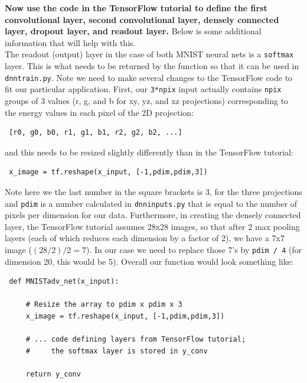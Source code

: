 \documentclass[10pt]{article}
\begin{document}
\noindent \textbf{Now use the code in the TensorFlow tutorial to define the first convolutional layer, second convolutional layer, densely connected layer, dropout layer, and readout layer.}  Below is some additional information that will help with this.\\

\noindent The readout 
(output) layer in the case of both MNIST neural nets is a \verb|softmax| layer.  This is what needs to be returned by the function so that it can be used in \verb|dnntrain.py|.  Note we need to
make several changes to the TensorFlow code to fit our particular application.  First, our \verb|3*npix| input actually contains \verb|npix| groups of 3 values (r, g, and b for xy, yz, and xz projections) corresponding 
to the energy values in each pixel of the 2D projection:

\begin{verbatim}
 [r0, g0, b0, r1, g1, b1, r2, g2, b2, ...]
\end{verbatim}

\noindent and this needs to be resized slightly differently than in the TensorFlow tutorial:

\begin{verbatim}
 x_image = tf.reshape(x_input, [-1,pdim,pdim,3])
\end{verbatim}

\noindent Note here we the last number in the square brackets is 3, for the three projections and \verb|pdim| is a number calculated in \verb|dnninputs.py| that is equal to the number of
pixels per dimension for our data.  Furthermore, in creating the densely connected layer, the TensorFlow tutorial assumes 
28x28 images, so that after 2 max pooling layers (each of which reduces each dimension
by a factor of 2), we have a 7x7 image ($(28 / 2) / 2 = 7$).  In our case we need to replace those 7's by \verb|pdim / 4| (for dimension 20, this would be 5).  Overall our function would
look something like:
\newpage
\begin{verbatim}
 def MNISTadv_net(x_input):

     # Resize the array to pdim x pdim x 3
     x_image = tf.reshape(x_input, [-1,pdim,pdim,3])
     
     # ... code defining layers from TensorFlow tutorial; 
     #     the softmax layer is stored in y_conv
     
     return y_conv
\end{verbatim}
\end{document}
